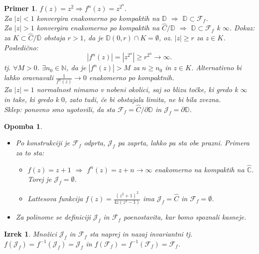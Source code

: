 \documentclass{article}
\newtheorem{opomba}{Opomba}
\newtheorem{primer}{Primer}
\newtheorem{izrek}{Izrek}
\newcommand{\C}{\mathbb{C}}
\newcommand{\D}{\mathbb{D}}
\newcommand{\N}{\mathbb{N}}
\newcommand{\F}{\mathcal{F}}
\begin{document}
\begin{primer}
$f(z) = z^2 \Longrightarrow f^n(z) = z^{2^n}$. \\ 
Za $|z| < 1$ konvergira enakomerno po kompaktih na $\D$ $\Longrightarrow$ $\D \subset \F_f$.\\ 
Za $|z| > 1$ konvergira enakomerno po kompaktih na $\hat{C}\slash\D$ $\Longrightarrow$ $\D \subset \F_f$ k $\infty$.
Dokaz: za $K \subset \hat{C} \slash \overline{\D}$ obstaja $r > 1$, da je $\D(0, r) \cap K = \emptyset$, oz. $|z| \geq r$ za $z\in K$. \\ 
Posledično:
$$
|f^n(z)| = |z^{2^n}| \geq r^{2^n} \rightarrow \infty.
$$ 
tj. $\forall M > 0$. $\exists n_0 \in \N$, da je $|f^n(z)| > M$ za $n \geq n_0$ in $z\in K$. Alternativno bi lahko oravnavali $\frac{1}{f^n(z)} \rightarrow 0$ enakomerno po kompaktnih. \\ 
Za $|z| = 1$ normalnost nimamo v nobeni okolici, saj so blizu točke, ki gredo k $\infty$ in take, ki gredo k $0$, zato tudi, če bi obstajala limita, ne bi bila zvezna.\\ 
Sklep: ponovno smo ugotovili, da sta $\F_f = \hat{C}\slash \partial \D$ in $\mathcal{J}_f = \partial \D$.
\end{primer}

\begin{opomba}
\hfill
\begin{itemize}
\item Po konstrukciji je $\F_f$ odprta, $\mathcal{J}_f$ pa zaprta, lahko pa sta obe prazni. Primera za to sta:
\begin{itemize}
\item $f(z) = z + 1$ $\Longrightarrow$ $f^n(z) = z + n \longrightarrow \infty$ enakomerno na kompaktih na $\hat{\C}$. Torej je $\mathcal{J}_f = \emptyset$.
\item Lattesova funkcija $f(z) = \frac{(z^2 + 1)^2}{4z(z^2 - 1)}$ ima $\mathcal{J}_f = \hat{C}$ in $\F_f = \emptyset$.
\end{itemize}
\item Za polinome se definiciji $\mathcal{J}_f$ in $\F_f$ poenostavita, kar bomo spoznali kasneje.
\end{itemize}
\end{opomba}

\begin{izrek}
Množici $\mathcal{J}_f$ in $\F_f$ sta naprej in nazaj invariantni tj. $f(\mathcal{J}_f) = f^{-1}(\mathcal{J}_f) = \mathcal{J}_f$ in $f(\mathcal{F}_f) = f^{-1}(\mathcal{F}_f) = \mathcal{F}_f$.
\end{izrek}
\end{document}
